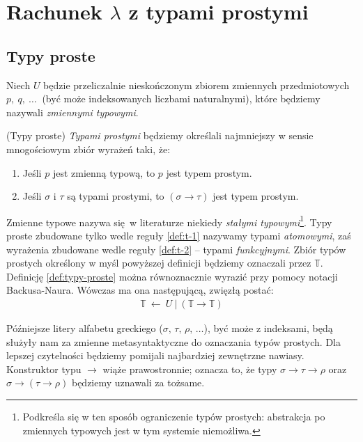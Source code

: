 \section{Rachunek \(\lambda\) z typami prostymi}\label{sec:simple_types}
\subsection{Typy proste}\label{ssec:typy-proste}
Niech \(U\) będzie przeliczalnie nieskończonym zbiorem zmiennych przedmiotowych \(p,\ q,\ \dots\ \) (być może indeksowanych liczbami naturalnymi), które będziemy nazywali \emph{zmiennymi typowymi}.

\begin{definicja}\label{def:typy-proste}(Typy proste)
\emph{Typami prostymi} będziemy określali najmniejszy w sensie mnogościowym zbiór wyrażeń taki, że:
\begin{enumerate}[label=(S\arabic*)]
  \setlength\itemsep{0em}
  \item Jeśli \(p\) jest zmienną typową, to \(p\) jest typem prostym.\label{def:t-1}
  \item Jeśli \(\sigma\) i \(\tau\) są typami prostymi, to \(\left(\sigma\to\tau\right)\) jest typem prostym.\label{def:t-2}
\end{enumerate}
\end{definicja}

Zmienne typowe nazywa się w literaturze niekiedy \emph{stałymi typowymi}\footnote{Podkreśla się w ten sposób ograniczenie typów prostych: abstrakcja po zmiennych typowych jest w tym systemie niemożliwa.}. Typy proste zbudowane tylko wedle reguły \ref{def:t-1} nazywamy typami \emph{atomowymi}, zaś wyrażenia zbudowane wedle reguły \ref{def:t-2} -- typami \emph{funkcyjnymi}. Zbiór typów prostych określony w myśl powyższej definicji będziemy oznaczali przez \(\mathbb{T}\). Definicję \ref{def:typy-proste} można równoznacznie wyrazić przy pomocy notacji Backusa-Naura. Wówczas ma ona następującą, zwięzłą postać:
\begin{align*}
  \mathbb{T}\ \leftarrow \ U\ |\ (\mathbb{T}\to\mathbb{T})
\end{align*}

Późniejsze litery alfabetu greckiego (\(\sigma,\, \tau,\, \rho,\,\dots\)), być może z indeksami, będą służyły nam za zmienne metasyntaktyczne do oznaczania typów prostych. Dla lepszej czytelności będziemy pomijali najbardziej zewnętrzne nawiasy. Konstruktor typu \(\to\) wiąże prawostronnie; oznacza to, że typy \(\sigma\to\tau\to\rho\) oraz \(\sigma\to(\tau\to\rho)\) będziemy uznawali za tożsame.

